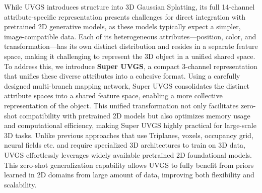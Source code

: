 

While UVGS introduces structure into 3D Gaussian Splatting, its full 14-channel attribute-specific representation presents challenges for direct integration with pretrained 2D generative models, as these models typically expect a simpler, image-compatible data. 
Each of its heterogeneous attributes—position, color, and transformation—has its own distinct distribution and resides in a separate feature space, making it challenging to represent the 3D object in a unified shared space.
 To address this, we introduce \textbf{Super UVGS}, a compact 3-channel representation that unifies these diverse attributes into a cohesive format. Using a carefully designed multi-branch mapping network, Super UVGS consolidates the distinct attribute spaces into a shared feature space, enabling a more collective representation of the object. This unified transformation not only facilitates zero-shot compatibility with pretrained 2D models but also optimizes memory usage and computational efficiency, making Super UVGS highly practical for large-scale 3D tasks.
 Unlike previous approaches that use Triplanes, voxels, occupancy grid, neural fields etc. and require specialized 3D architectures to train on 3D data, UVGS effortlessly leverages widely available pretrained 2D foundational models.
This zero-shot generalization capability allows UVGS to fully benefit from priors learned in 2D domains from large amount of data, improving both flexibility and scalability.
